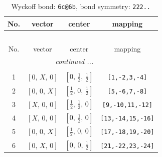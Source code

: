 \documentclass[fleqn,8pt]{jsarticle}
\begin{document}
\begin{longtable}{cccc}
\caption{Wyckoff bond: {\tt 6c@6b}, bond symmetry: {\tt 222..}}
 \\
 \hline \hline
No. & vector & center & mapping \\ \hline \endfirsthead

\multicolumn{3}{l}{\tablename\ \thetable{}} \\
 \hline \hline
No. & vector & center & mapping \\ \hline \endhead

 \hline \hline
\multicolumn{3}{r}{\footnotesize\it continued ...} \\ \endfoot

 \hline \hline
\multicolumn{3}{r}{} \\ \endlastfoot

1 & $\left[ 0,\, X,\, 0 \right]$ & $\left[ 0,\, \frac{1}{2},\, \frac{1}{2} \right]$ & {\tt [1,-2,3,-4]} \\ \hline
2 & $\left[ 0,\, 0,\, X \right]$ & $\left[ \frac{1}{2},\, 0,\, \frac{1}{2} \right]$ & {\tt [5,-6,7,-8]} \\ \hline
3 & $\left[ X,\, 0,\, 0 \right]$ & $\left[ \frac{1}{2},\, \frac{1}{2},\, 0 \right]$ & {\tt [9,-10,11,-12]} \\ \hline
4 & $\left[ X,\, 0,\, 0 \right]$ & $\left[ 0,\, \frac{1}{2},\, 0 \right]$ & {\tt [13,-14,15,-16]} \\ \hline
5 & $\left[ 0,\, 0,\, X \right]$ & $\left[ \frac{1}{2},\, 0,\, 0 \right]$ & {\tt [17,-18,19,-20]} \\ \hline
6 & $\left[ 0,\, X,\, 0 \right]$ & $\left[ 0,\, 0,\, \frac{1}{2} \right]$ & {\tt [21,-22,23,-24]} \\
\end{longtable}
\renewcommand{\arraystretch}{1.2}
\end{document}
